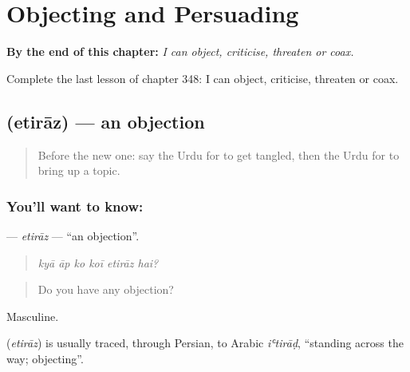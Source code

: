 
\chapter{Objecting and Persuading}
\label{ch:ur-objecting-and-persuading}

\begin{chapteropening}
\textbf{By the end of this chapter:} \emph{I can object, criticise, threaten or coax.}

Complete the last lesson of chapter 348: I can object, criticise, threaten or coax.
\end{chapteropening}

\section[\texorpdfstring{\ur{اعتراض} (etirāz)}{اعتراض (etirāz)}]{ (etirāz) — an objection}

\label{lesson:UR-C348-etiraz}



\begin{quote}
Before the new one: say the Urdu for to get tangled, then the Urdu for to bring up a topic.
\end{quote}

\subsection*{You'll want to know: }
\textbf{} — \emph{etirāz} — \textquotedblleft{}an objection\textquotedblright{}.

\begin{quote}
     
\end{quote}

\begin{quote}
\emph{kyā āp ko koī etirāz hai?}
\end{quote}

\begin{quote}
Do you have any objection?
\end{quote}

Masculine.

\begin{cousinweb}
\textbf{} (\emph{etirāz}) is usually traced, through Persian, to Arabic \emph{iʿtirāḍ}, \textquotedblleft{}standing across the way; objecting\textquotedblright{}.
\end{cousinweb}

